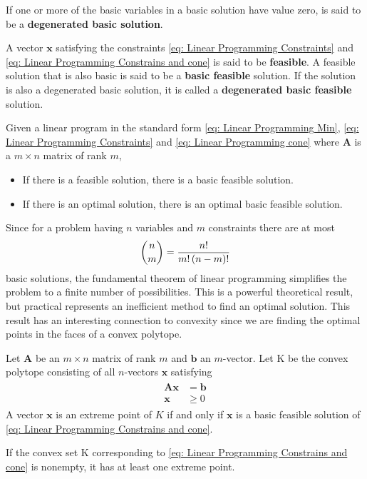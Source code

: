 \begin{definition}
If one or more of the basic variables in a basic solution have value zero, is said to be a \textbf{degenerated basic solution}.
\end{definition}

\begin{definition}
	A vector $\mathbf{x}$ satisfying the constraints \eqref{eq: Linear Programming Constraints} and \eqref{eq: Linear Programming Constrains and cone} is said to be \textbf{feasible}. A feasible solution that is also basic is said to be a \textbf{basic feasible} solution. If the solution is also a degenerated basic solution, it is called a \textbf{degenerated basic feasible} solution. 
\end{definition} 

\begin{theorem} Given a linear program in the standard form \eqref{eq: Linear Programming Min}, \eqref{eq: Linear Programming Constraints} and \eqref{eq: Linear Programming cone} where $\mathbf{A}$ is a $m\times n $ matrix of rank $m$,
	\begin{itemize}
		\item If there is a feasible solution, there is a basic feasible solution.
		\item If there is an optimal solution, there is an optimal basic feasible solution. 
	\end{itemize}
\end{theorem}
Since for a problem having $n$ variables and $m$ constraints there are at most
\begin{equation*}
	\binom{n}{m}=\frac{n!}{m!\left( n-m \right)!}
\end{equation*}
basic solutions, the fundamental theorem of linear programming simplifies the problem to a finite number of possibilities. This is a  powerful theoretical result, but practical represents an inefficient method to find an optimal solution. This result has an interesting connection to convexity since we are finding the optimal points in the faces of a convex polytope.

\begin{theorem}
	Let $\mathbf{A}$ be an $m\times n$ matrix of rank $m$ and $\mathbf{b}$ an $m$-vector. Let K be the convex polytope consisting of all $n$-vectors $\mathbf{x}$ satisfying
	\begin{align}
		\begin{array}{cc}
		\mathbf{A}\mathbf{x}&=\mathbf{b} \\
		\mathbf{x}&\geq 0		
		\end{array}
	\label{eq: Linear Programming Constrains and cone}
	\end{align}
	A vector $\mathbf{x}$ is an extreme point of $K$ if and only if $\mathbf{x}$ is a basic feasible solution of \eqref{eq: Linear Programming Constrains and cone}.
\end{theorem}
\begin{corollary}
If the convex set K corresponding to \eqref{eq: Linear Programming Constrains and cone} is nonempty, it has at least one extreme point.
\end{corollary}

